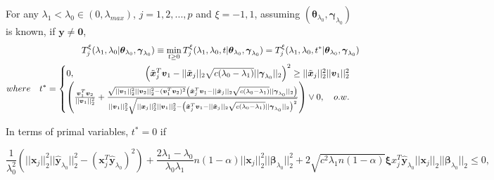 \begin{theorem}
    \label{thm:2.2}
    For any $\lambda_1<\lambda_{0}\in (0,\lambda_{max})$, $j=1,2,...,p$ and $\xi=-1,1$, assuming $(\boldsymbol\theta_{\lambda_0},\boldsymbol\gamma_{\lambda_0})$ is known, if $\boldsymbol y\neq \boldsymbol 0$,
    \begin{gather}
        \begin{aligned}
            T^\xi_j(\lambda_1,\lambda_0|\boldsymbol\theta_{\lambda_0},\boldsymbol\gamma_{\lambda_0})\equiv\underset{t\geq 0}{\mathrm{min}}\,T^\xi_j(\lambda_1,\lambda_0,t|\boldsymbol\theta_{\lambda_0},\boldsymbol\gamma_{\lambda_0})=T^\xi_j(\lambda_1,\lambda_0,t^*|\boldsymbol\theta_{\lambda_0},\boldsymbol\gamma_{\lambda_0})\\
            where\quad t^*=\begin{cases}
            0,\hfill \left(\tilde{\boldsymbol x}_j^T\boldsymbol v_1-||\tilde{\boldsymbol x}_j||_2\sqrt{c(\lambda_0-\lambda_1)}||\boldsymbol\gamma_{\lambda_0}||_2\right)^2\geq ||\tilde{\boldsymbol x}_j||^2_2||\boldsymbol v_1||^2_2\\
            \left(\frac{\boldsymbol v_1^T\boldsymbol v_2}{||\boldsymbol v_1||_2^2}+\frac{\sqrt{||\boldsymbol v_1||_2^2||\boldsymbol v_2||_2^2-(\boldsymbol v_1^T\boldsymbol v_2)^2}\left(\tilde{\boldsymbol x}_j^T\boldsymbol v_1-||\tilde{\boldsymbol x}_j||_2\sqrt{c(\lambda_0-\lambda_1)}||\boldsymbol\gamma_{\lambda_0}||_2\right)}{||\boldsymbol v_1||_2^2\sqrt{||\boldsymbol x_j||_2^2||\boldsymbol v_1||_2^2-\left(\tilde{\boldsymbol x}_j^T\boldsymbol v_1-||\tilde{\boldsymbol x}_j||_2\sqrt{c(\lambda_0-\lambda_1)}||\boldsymbol\gamma_{\lambda_0}||_2\right)^2}}\right)\vee 0,\hfill\quad o.w.
            \end{cases}
        \end{aligned}
    \end{gather}
\end{theorem}

In terms of primal variables, $t^*=0$ if

\begin{equation}
    \frac{1}{\lambda_0^2}\left(||\boldsymbol x_j||_2^2||\hat{\boldsymbol y}_{\lambda_0}||_2^2-(\boldsymbol x_j^T\hat{\boldsymbol y}_{\lambda_0})^2\right)+\frac{2\lambda_1-\lambda_0}{\lambda_0\lambda_1}n(1-\alpha)||\boldsymbol x_j||_2^2||\boldsymbol\beta_{\lambda_0}||_2^2+2\sqrt{c^2\lambda_1n(1-\alpha)}\boldsymbol \xi x_j^T\hat{\boldsymbol y}_{\lambda_0}||\boldsymbol x_j||_2||\boldsymbol\beta_{\lambda_0}||_2\leq 0,
\end{equation}

